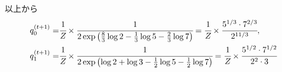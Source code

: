 \begin{example}
以上から
\begin{align*}
	q^{(t+1)}_0
		=& \cfrac{1}{Z} \times
			\cfrac{1}{2\exp \left( \frac{8}{3} \log 2 - \frac{1}{3} \log 5 - \frac{2}{3} \log 7 \right)}
		= \cfrac{1}{Z} \times 
			\cfrac{5^{1/3} \cdot 7^{2/3}}{2^{11/3}}
			, \\
	q^{(t+1)}_1
		=& \cfrac{1}{Z} \times
			\cfrac{1}{2\exp \left( \log 2 + \log 3 - \frac{1}{2} \log 5 - \frac{1}{2} \log 7 \right)} 
		= \cfrac{1}{Z} \times
			\cfrac{5^{1/2}\cdot 7^{1/2}}{2^2 \cdot 3}
\end{align*}


\end{example}
